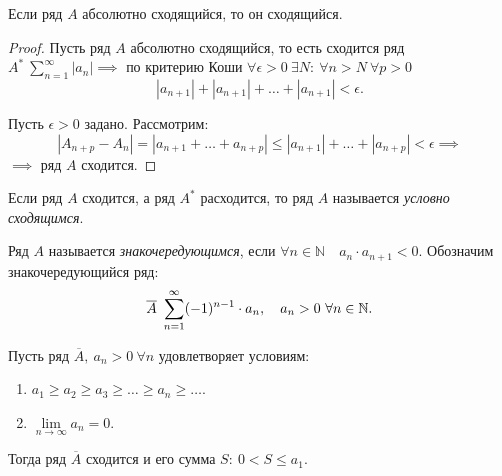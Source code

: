 \begin{statement}
    Если ряд $A$ абсолютно сходящийся, то он сходящийся.
\end{statement}

\begin{proof}
    Пусть ряд $A$ абсолютно сходящийся, то есть сходится ряд $A^* \ \sum_{n=1}^{\infty}|a_n| \implies$ по критерию Коши $\forall \epsilon > 0 \ \exists N: \ \forall n > N \ \forall p > 0$
    \[
        |a_{n+1}| + |a_{n+1}| + \ldots + |a_{n+1}| < \epsilon.
    \]

    Пусть $\epsilon > 0$ задано. Рассмотрим:
    \[
        |A_{n+p} - A_n| = |a_{n+1} + \ldots + a_{n+p}| \leqslant |a_{n+1}| + \ldots + |a_{n+p}| < \epsilon \implies
    \]
    $\implies$ ряд $A$ сходится.
\end{proof}

\begin{definition}
    Если ряд $A$ сходится, а ряд $A^*$ расходится, то ряд $A$ называется \emph{условно сходящимся}.
\end{definition}

\begin{definition}
    Ряд $A$ называется \emph{знакочередующимся}, если $\forall n \in \mathbb{N} \quad a_n \cdot a_{n+1} < 0$. Обозначим знакочередующийся ряд:
    \[
        \overline{A} \ \sum_{n=1}^{\infty}(-1)^{n-1}\cdot a_n, \quad a_n > 0 \ \forall n \in\mathbb{N}.
    \]
\end{definition}

\begin{theorem}
    Пусть ряд $\overline{A}, \ a_n > 0 \ \forall n$ удовлетворяет условиям:
    \begin{enumerate}
        \item $a_1 \geqslant a_2 \geqslant a_3 \geqslant \ldots \geqslant a_n \geqslant \ldots$.
        \item $\underset{n\rightarrow\infty}{\lim} a_n = 0$.
    \end{enumerate}

    Тогда ряд $\overline{A}$ сходится и его сумма $S: \ 0 < S \leqslant a_1$.
\end{theorem}

